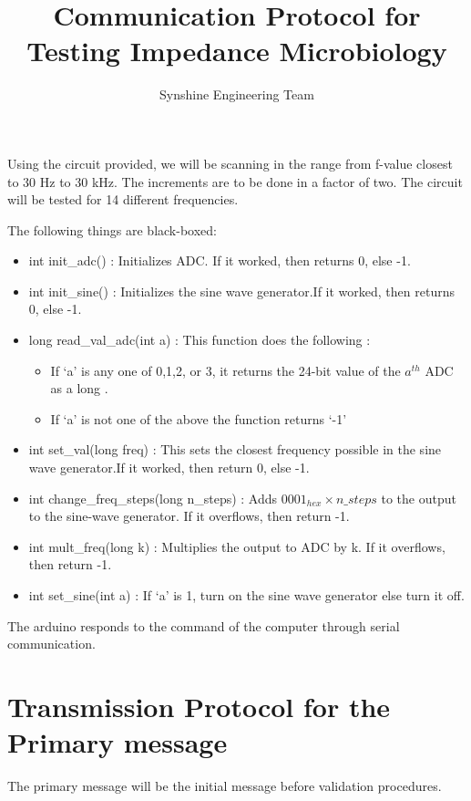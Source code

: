 \documentclass [a4paper,11pt]{article}
\begin{document}
\title{Communication Protocol for Testing Impedance Microbiology}
\author{Synshine Engineering Team}
\date{}
\maketitle

Using the circuit provided, we will be scanning in the range from f-value closest to 30 Hz to 30 kHz. The increments are to be done in a factor of two. The circuit will be tested for 14 different frequencies.

The following things are black-boxed:
\begin{itemize}
\item int init\_adc() : Initializes ADC. If it worked, then returns 0, else -1.
\item int init\_sine() : Initializes the sine wave generator.If it worked, then returns 0, else -1.
\item long read\_val\_adc(int a) : This function does the following :
	\begin{itemize}
		\item If `a' is any one of 0,1,2, or 3, it returns the 24-bit value of the $a^{th}$ ADC as a long .
		\item If `a' is not one of the above the function returns `-1'
	\end{itemize}
\item int set\_val(long freq) : This sets the closest frequency possible in the sine wave generator.If it worked, then return 0, else -1.
\item int change\_freq\_steps(long n\_steps) : Adds $0001_{hex} \times n\_steps$ to the output to the sine-wave generator. If it overflows, then return -1.
\item int mult\_freq(long k) : Multiplies the output to ADC by k. If it overflows, then return -1.
\item int set\_sine(int a) : If `a' is 1, turn on the sine wave generator else turn it off.
\end{itemize}

The arduino responds to the command of the computer through serial communication.
\section{Transmission Protocol for the Primary message}
The primary message will be the initial message before validation procedures.
\end{document}
